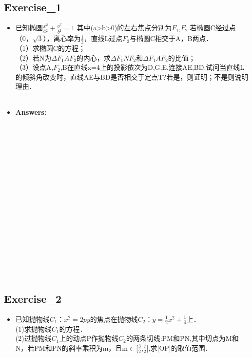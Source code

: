 \subsection{Exercise_1}
\begin{itemize}
\item 已知椭圆$\frac{x^2}{a^2}+\frac{y^2}{b^2}=1$
其中(a>b>0)的左右焦点分别为$F_1$,$F_2$.若椭圆C经过点（0，$\sqrt{3}$），离心率为$\frac{1}{2}$，直线L过点$F_2$与椭圆C相交于A，B两点．\\
（1）求椭圆C的方程；\\
（2）若N为$\Delta F_1AF_2$的内心，求$\Delta F_1NF_2$和$\Delta F_1AF_2$的比值；\\
（3）设点A,$F_2$,B在直线x=4上的投影依次为D,G,E,连接AE,BD.试问当直线L的倾斜角改变时，直线AE与BD是否相交于定点T?若是，则证明；不是则说明理由．\\
\\
\item \textbf{Answers:}\\

\end{itemize}
\\ \\ \\ \\ \\ \\ \\ \\ \\ \\ \\ \\ \\ \\ \\ \\
\subsection{Exercise_2}
\begin{itemize}
\item 已知抛物线$C_1$：$x^2=2py$的焦点在抛物线$C_2$：$y=\frac{1}{2}x^2+\frac{1}{4}$上．\\
(1)求抛物线$C_1$的方程．\\
(2)过抛物线$C_1$上的动点P作抛物线$C_2$的两条切线:PM和PN,其中切点为M和N，若PM和PN的斜率乘积为m，且m$\in$[$\frac{3}{2}$,$\frac{7}{2}$],求|OP|的取值范围．\\
\end{itemize}
\\ \\ \\ \\ \\ \\ \\ \\ \\ \\ \\ \\ \\ \\ \\ \\

